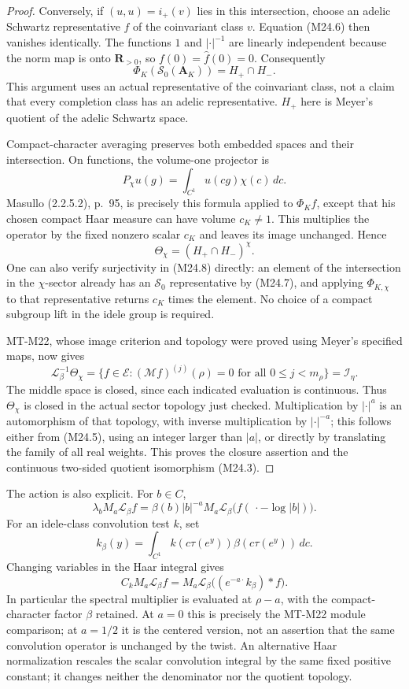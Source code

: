 \begin{proof}
Conversely, if $(u,u)=i_+(v)$ lies in this intersection, choose
an adelic Schwartz representative $f$ of the coinvariant class
$v$. Equation (M24.6) then vanishes identically. The functions
$1$ and $|\cdot|^{-1}$ are linearly independent because the norm
map is onto $\mathbf R_{>0}$, so $f(0)=\widehat f(0)=0$.
Consequently
\[
       \Phi_K(\mathcal S_0(\mathbf A_K))=H_+\cap H_-.
 \tag{M24.7}
\]
This argument uses an actual representative of the coinvariant
class, not a claim that every completion class has an adelic
representative. $H_+$ here is Meyer's quotient of the adelic
Schwartz space.

Compact-character averaging preserves both embedded spaces
and their intersection. On functions, the volume-one projector is
\[
 P_\chi u(g)=\int_{C^1}u(cg)\chi(c)\,dc.
\]
Masullo (2.2.5.2), p.~95, is precisely this formula applied to
$\Phi_K f$, except that his chosen compact Haar measure can have
volume $c_K\ne1$. This multiplies the operator by the fixed
nonzero scalar $c_K$ and leaves its image unchanged. Hence
\[
       \Theta_\chi=(H_+\cap H_-)^\chi.
 \tag{M24.8}
\]
One can also verify surjectivity in (M24.8) directly: an element
of the intersection in the $\chi$-sector already has an
$\mathcal S_0$ representative by (M24.7), and applying
$\Phi_{K,\chi}$ to that representative returns $c_K$ times the
element. No choice of a compact subgroup lift in the idele group
is required.

MT-M22, whose image criterion and topology were proved using
Meyer's specified maps, now gives
\[
 \mathcal L_\beta^{-1}\Theta_\chi
 =\{f\in\mathcal E:(\mathcal Mf)^{(j)}(\rho)=0
         \text{ for all }0\le j<m_\rho\}
 =\mathcal I_\eta.
 \tag{M24.9}
\]
The middle space is closed, since each indicated evaluation is
continuous. Thus $\Theta_\chi$ is closed in the actual sector
topology just checked. Multiplication by $|\cdot|^a$ is an
automorphism of that topology, with inverse multiplication by
$|\cdot|^{-a}$; this follows either from (M24.5), using an
integer larger than $|a|$, or directly by translating the family
of all real weights. This proves the closure assertion and the
continuous two-sided quotient isomorphism (M24.3).
\end{proof}

The action is also explicit. For $b\in C$,
\[
 \lambda_b M_a\mathcal L_\beta f
  =\beta(b)|b|^{-a}M_a\mathcal L_\beta
       \bigl(f(\,\cdot-\log|b|)\bigr).
 \tag{M24.10}
\]
For an idele-class convolution test $k$, set
\[
 k_\beta(y)=\int_{C^1}k(c\tau(e^y))\beta(c\tau(e^y))\,dc.
\]
Changing variables in the Haar integral gives
\[
 C_k M_a\mathcal L_\beta f
   =M_a\mathcal L_\beta\bigl((e^{-a\cdot}k_\beta)*f\bigr).
 \tag{M24.11}
\]
In particular the spectral multiplier is evaluated at $\rho-a$,
with the compact-character factor $\beta$ retained. At $a=0$ this
is precisely the MT-M22 module comparison; at $a=1/2$ it is the
centered version, not an assertion that the same convolution
operator is unchanged by the twist.
An alternative Haar normalization rescales the scalar convolution
integral by the same fixed positive constant; it changes neither
the denominator nor the quotient topology.

